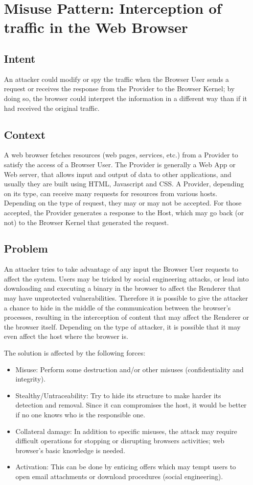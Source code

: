 \documentclass{sig-alternate-05-2015}
\begin{document}
\section{Misuse Pattern: Interception of traffic in the Web Browser}
\subsection*{Intent}
An attacker could modify or spy the traffic when the Browser User sends a request or receives the response from the Provider to the Browser Kernel; by doing so, the browser could interpret the information in a different way than if it had received the original traffic.

\subsection*{Context}
A web browser fetches resources (web pages, services, etc.) from a Provider to satisfy the access of a Browser User. The Provider is generally a Web App or Web server, that allows input and output of data to other applications, and usually they are built using HTML, Javascript and CSS. A Provider, depending on its type, can receive many requests for resources from various hosts. Depending on the type of request, they may or may not be accepted. For those accepted, the Provider generates a response to the Host, which may go back (or not) to the Browser Kernel that generated the request.

\subsection*{Problem}
An attacker tries to take advantage of any input the Browser User requests to affect the system. Users may be tricked by social engineering attacks, or lead into downloading and executing a binary in the browser to affect the Renderer that may have unprotected vulnerabilities. Therefore it is possible to give the attacker a chance to hide in the middle of the communication between the browser's processes, resulting in the interception of content that may affect the Renderer or the browser itself. Depending on the type of attacker, it is possible that it may even affect the host where the browser is.

The solution is affected by the following forces:
\begin{itemize}
  \item Misuse: Perform some destruction and/or other misuses (confidentiality and integrity).
  \item Stealthy/Untraceability: Try to hide its structure to make harder its detection and removal. Since it can compromises the host, it would be better if no one knows who is the responsible one. 
  \item Collateral damage: In addition to specific misuses, the attack may require difficult operations for stopping or disrupting browsers activities; web browser's basic knowledge is needed.
  \item Activation: This can be done by enticing offers which may tempt users to open email attachments or download procedures (social engineering).
\end{itemize}
\end{document}
